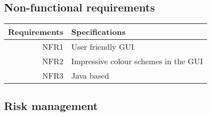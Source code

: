 \documentclass{article}
\begin{document}
\subsection{Non-functional requirements}

\begin{tabular}{|r|l|}

\hline
Requirements & Specifications\\[5pt]
\hline
NFR1&
User friendly GUI
\\\hline

NFR2&
Impressive colour schemes in the GUI
\\\hline

NFR3&
Java based
\\\hline

\end{tabular}

\subsection{Risk management}
\label{sec:riskman}
\pagebreak





\end{document}
